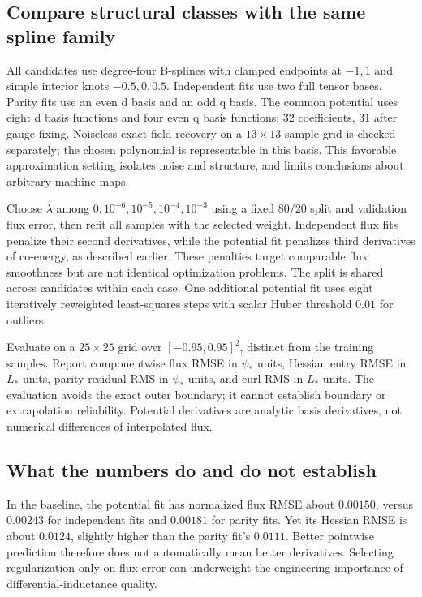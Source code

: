 \subsection{Compare structural classes with the same spline family}
All candidates use degree-four B-splines with clamped endpoints at $-1,1$
and simple interior knots $-0.5,0,0.5$. Independent fits use two full tensor
bases. Parity fits use an even d basis and an odd q basis. The common potential
uses eight d basis functions and four even q basis functions: 32 coefficients,
31 after gauge fixing. Noiseless exact field recovery on a $13\times13$ sample
grid is checked separately; the chosen polynomial is representable in this
basis. This favorable approximation setting isolates noise and structure,
and limits conclusions about arbitrary machine maps.

Choose $\lambda$ among $0,10^{-6},10^{-5},10^{-4},10^{-3}$ using a fixed
80/20 split and validation flux error, then refit all samples with the selected
weight. Independent flux fits penalize their second derivatives, while the
potential fit penalizes third derivatives of co-energy, as described earlier.
These penalties target comparable flux smoothness but are not identical
optimization problems. The split is shared across candidates within each
case. One additional potential fit uses eight iteratively reweighted
least-squares steps with scalar Huber threshold $0.01$ for outliers.

Evaluate on a $25\times25$ grid over $[-0.95,0.95]^2$, distinct from the
training samples. Report componentwise flux RMSE in $\psi_*$ units, Hessian
entry RMSE in $L_*$ units, parity residual RMS in $\psi_*$ units, and curl
RMS in $L_*$ units. The evaluation avoids the exact outer boundary; it cannot
establish boundary or extrapolation reliability. Potential derivatives are
analytic basis derivatives, not numerical differences of interpolated flux.
\begin{table}[tbp]
\centering\scriptsize
\caption{A single seeded illustrative experiment. Independent and parity
fits use flux B-splines; potential fits use co-energy gradients. Structural
zeros hold by construction. This is not an RBF benchmark or a statistical
ranking across many machines and sampling realizations.}
\label{tab:fit-metrics}
\end{table}


\subsection{What the numbers do and do not establish}
In the baseline, the potential fit has normalized flux RMSE about $0.00150$,
versus $0.00243$ for independent fits and $0.00181$ for parity fits.
Yet its Hessian RMSE is about $0.0124$, slightly higher than the parity fit's
$0.0111$. Better pointwise prediction therefore does not automatically mean
better derivatives. Selecting regularization only on flux error can underweight
the engineering importance of differential-inductance quality.

